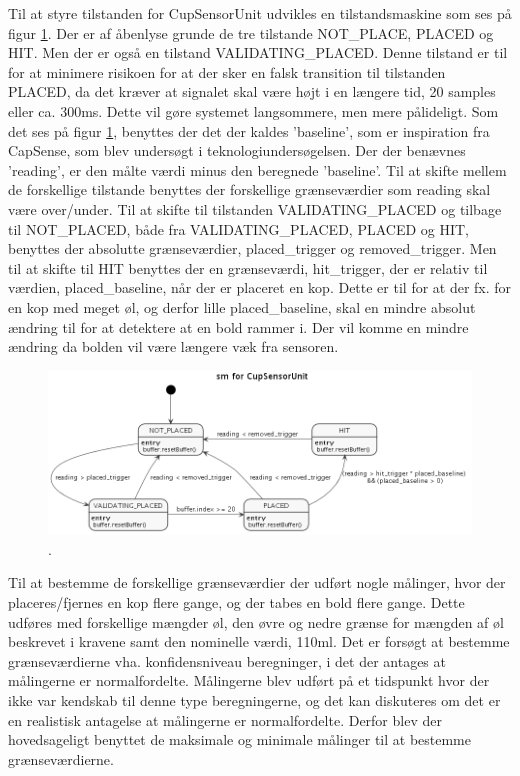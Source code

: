 \documentclass[Softwaredesign/Softwaredesign_main.tex]{subfiles}
\begin{document}
Til at styre tilstanden for CupSensorUnit udvikles en tilstandsmaskine som ses på figur \ref{fig:CupSensor-IF-state}. Der er af åbenlyse grunde de tre tilstande NOT\_PLACE, PLACED og HIT. Men der er også en tilstand VALIDATING\_PLACED. Denne tilstand er til for at minimere risikoen for at der sker en falsk transition til tilstanden PLACED, da det kræver at signalet skal være højt i en længere tid, 20 samples eller ca. 300ms. Dette vil gøre systemet langsommere, men mere pålideligt. Som det ses på figur \ref{fig:CupSensor-IF-state}, benyttes der det der kaldes 'baseline', som er inspiration fra CapSense, som blev undersøgt i teknologiundersøgelsen. Der der benævnes 'reading', er den målte værdi minus den beregnede 'baseline'. Til at skifte mellem de forskellige tilstande benyttes der forskellige grænseværdier som reading skal være over/under. Til at skifte til tilstanden VALIDATING\_PLACED og tilbage til NOT\_PLACED, både fra VALIDATING\_PLACED, PLACED og HIT, benyttes der absolutte grænseværdier, placed\_trigger og removed\_trigger. Men til at skifte til HIT benyttes der en grænseværdi, hit\_trigger, der er relativ til værdien, placed\_baseline, når der er placeret en kop. Dette er til for at der fx. for en kop med meget øl, og derfor lille placed\_baseline, skal en mindre absolut ændring til for at detektere at en bold rammer i. Der vil komme en mindre ændring da bolden vil være længere væk fra sensoren.

\begin{figure}[H]
    \centering
    \includegraphics[width=1\textwidth]{Softwaredesign/CupSensor_IF/graphics/state.png}
    \caption{.}
    \label{fig:CupSensor-IF-state}
\end{figure}

Til at bestemme de forskellige grænseværdier der udført nogle målinger, hvor der placeres/fjernes en kop flere gange, og der tabes en bold flere gange. Dette udføres med forskellige mængder øl, den øvre og nedre grænse for mængden af øl beskrevet i kravene samt den nominelle værdi, 110ml. Det er forsøgt at bestemme grænseværdierne vha. konfidensniveau beregninger, i det der antages at målingerne er normalfordelte. Målingerne blev udført på et tidspunkt hvor der ikke var kendskab til denne type beregningerne, og det kan diskuteres om det er en realistisk antagelse at målingerne er normalfordelte. Derfor blev der hovedsageligt benyttet de maksimale og minimale målinger til at bestemme grænseværdierne.  
\end{document}
